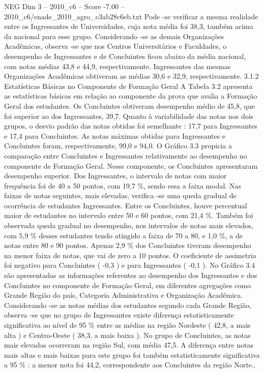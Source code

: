 \begin{textsample}{NEG Dim 3 – 2010\_c6 – Score -7.00 – 2010\_c6/enade\_2010\_agro\_c3ab28c6eb.txt}
Pode -se verificar a mesma realidade entre os Ingressantes de Universidades, cuja nota média foi 38,3, também acima da nacional para esse grupo.
Considerando -se as demais Organizações Acadêmicas, observa -se que nos Centros Universitários e Faculdades, o desempenho de Ingressantes e de Concluintes ficou abaixo da média nacional, com notas médias 43,8 e 44,9, respectivamente.
Ingressantes das mesmas Organizações Acadêmicas obtiveram as médias 30,6 e 32,9, respectivamente. 3.1.2 Estatísticas Básicas no Componente de Formação Geral A Tabela 3.2 apresenta as estatísticas básicas em relação ao componente da prova que avalia a Formação Geral dos estudantes.
Os Concluintes obtiveram desempenho médio de 45,8, que foi superior ao dos Ingressantes, 39,7.
Quanto à variabilidade das notas nos dois grupos, o desvio padrão das notas obtidas foi semelhante : 17,7 para Ingressantes e 17,4 para Concluintes.
As notas máximas obtidas para Ingressantes e Concluintes foram, respectivamente, 99,0 e 94,0.
O Gráfico 3.3 propicia a comparação entre Concluintes e Ingressantes relativamente ao desempenho no componente de Formação Geral.
Nesse componente, os Concluintes apresentaram desempenho superior.
Dos Ingressantes, o intervalo de notas com maior frequência foi de 40 a 50 pontos, com 19,7 \%, sendo essa a faixa modal.
Nas faixas de notas seguintes, mais elevadas, verifica -se uma queda gradual de ocorrência de estudantes Ingressantes.
Entre os Concluintes, houve percentual maior de estudantes no intervalo entre 50 e 60 pontos, com 21,4 \%.
Também foi observada queda gradual no desempenho, nos intervalos de notas mais elevados, com 5,9 \% desses estudantes tendo atingido a faixa de 70 a 80, e 1,0 \%, a de notas entre 80 e 90 pontos.
Apenas 2,9 \% dos Concluintes tiveram desempenho na menor faixa de notas, que vai de zero a 10 pontos.
O coeficiente de assimetria foi negativo para Concluintes ( -0,3 ) e para Ingressantes ( -0,1 ).
No Gráfico 3.4 são apresentadas as informações referentes ao desempenho dos Ingressantes e dos Concluintes no componente de Formação Geral, em diferentes agregações como Grande Região do país, Categoria Administrativa e Organização Acadêmica.
Considerando -se as notas médias dos estudantes segundo cada Grande Região, observa -se que no grupo de Ingressantes existe diferença estatisticamente significativa ao nível de 95 \% entre as médias na região Nordeste ( 42,8, a mais alta ) e Centro-Oeste ( 38,3, a mais baixa ).
No grupo de Concluintes, as notas mais elevadas ocorreram na região Sul, com média 47,5.
A diferença entre notas mais altas e mais baixas para este grupo foi também estatisticamente significativa a 95 \% : a menor nota foi 44,2, correspondente aos Concluintes da região Norte..

\end{textsample}
